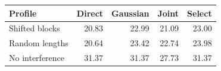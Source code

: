 \small\setlength{\tabcolsep}{3.2pt}
\begin{tabular}{lrrrr}
\toprule
Profile & Direct & Gaussian & Joint & Select\\
\midrule
Shifted blocks & 20.83 & 22.99 & 21.09 & 23.00\\
Random lengths & 20.64 & 23.42 & 22.74 & 23.98\\
No interference & 31.37 & 31.37 & 27.73 & 31.37\\
\bottomrule
\end{tabular}
